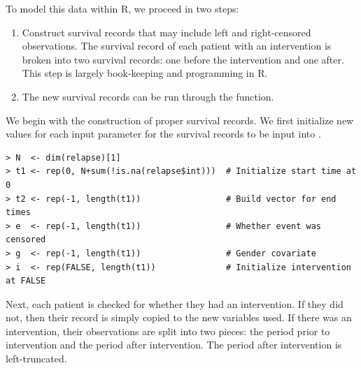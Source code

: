 \documentclass[11pt]{article}
\begin{document}
To model this data within R, we proceed in two steps:
\begin{enumerate}
\item Construct survival records that may include left and right-censored observations. The survival record of each patient with an intervention is broken into two survival records: one before the intervention and one after. This step is largely book-keeping and programming in R.
\item The new survival records can be run through the  function.
\end{enumerate}
We begin with the construction of proper survival records.
We first initialize new values for each input parameter for the survival records to be input into .
\begin{verbatim}
> N  <- dim(relapse)[1]
> t1 <- rep(0, N+sum(!is.na(relapse$int)))  # Initialize start time at 0
> t2 <- rep(-1, length(t1))                 # Build vector for end times
> e  <- rep(-1, length(t1))                 # Whether event was censored
> g  <- rep(-1, length(t1))                 # Gender covariate
> i  <- rep(FALSE, length(t1))              # Initialize intervention at FALSE
\end{verbatim}
Next, each patient is checked for whether they had an intervention. If they did not, then their record is simply copied to the new variables used. If there was an intervention, their observations are split into two pieces: the period prior to intervention and the period after intervention. The period after intervention is left-truncated.
\end{document}
